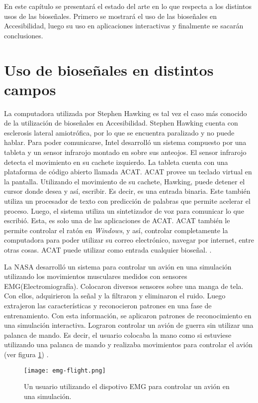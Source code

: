 En este capítulo se presentará el estado del arte en lo que respecta a los distintos usos de las bioseñales. Primero se mostrará el uso de las bioseñales en Accesibilidad, luego su uso en aplicaciones interactivas y finalmente se sacarán conclusiones. 

\section{Uso de bioseñales en distintos campos}

La computadora utilizada por Stephen Hawking es tal vez el caso más conocido de la utilización de bioseñales en Accesibilidad. Stephen Hawking cuenta con esclerosis lateral amiotrófica, por lo que se encuentra paralizado y no puede hablar. Para poder comunicarse, Intel desarrolló un sistema compuesto por una tableta y un sensor infrarojo montado en sobre sus anteojos. El sensor infrarojo detecta el movimiento en su cachete izquierdo. La tableta cuenta con una plataforma de código abierto llamada ACAT. ACAT provee un teclado virtual en la pantalla. Utilizando el movimiento de su cachete, Hawking, puede detener el cursor donde desea y así, escribir. Es decir, es una entrada binaria. Este también utiliza un procesador de texto con predicción de palabras que permite acelerar el proceso.  Luego, el sistema utiliza un sintetizador de voz para comunicar lo que escribió. Esta, es solo una de las aplicaciones de ACAT. ACAT también le permite controlar el ratón en \emph{Windows}, y así, controlar completamente la computadora para poder utilizar su correo electrónico, navegar por internet, entre otras cosas. ACAT puede utilizar como entrada cualquier bioseñal. \cite{hawking}.

La NASA desarrolló un sistema para controlar un avión en una simulación utilizando los movimientos musculares medidos con sensores EMG(Electromiografía). Colocaron diversos sensores sobre una manga de tela. Con ellos, adquirieron la señal y la filtraron y eliminaron el ruido. Luego extrajeron las características y reconocieron patrones en una fase de entrenamiento. Con esta información, se aplicaron patrones de reconocimiento en una simulación interactiva. Lograron controlar un avión de guerra sin utilizar una palanca de mando. Es decir, el usuario colocaba la mano como si estuviese utilizando una palanca de mando y realizaba movimientos para controlar el avión (ver figura \ref{fig:emg-flight}) \cite{emg-flight}.

\begin{figure}[H]
	\centering
    \texttt{[image: emg-flight.png]}
    \caption{Un usuario utilizando el dispotivo EMG para controlar un avión en una simulación.}
	\label{fig:emg-flight}
\end{figure}

